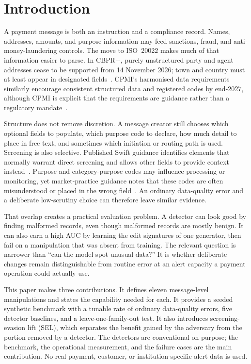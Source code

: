 \documentclass[conference]{IEEEtran}
\begin{document}
\section{Introduction}
A payment message is both an instruction and a compliance record. Names,
addresses, amounts, and purpose information may feed sanctions, fraud, and
anti-money-laundering controls. The move to ISO~20022 makes much of that
information easier to parse. In CBPR+, purely unstructured party and agent
addresses cease to be supported from 14 November 2026; town and country must
at least appear in designated fields~\cite{swift2026addr}. CPMI's harmonised
data requirements similarly encourage consistent structured data and
registered codes by end-2027, although CPMI is explicit that the requirements
are guidance rather than a regulatory mandate~\cite{cpmi2026}.

Structure does not remove discretion. A message creator still chooses which
optional fields to populate, which purpose code to declare, how much detail to
place in free text, and sometimes which initiation or routing path is used.
Screening is also selective. Published Swift guidance identifies elements that
normally warrant direct screening and allows other fields to provide context
instead~\cite{swiftgp2021}. Purpose and category-purpose codes may influence
processing or monitoring, yet market-practice guidance notes that these codes
are often misunderstood or placed in the wrong field~\cite{pmpg2024}. An
ordinary data-quality error and a deliberate low-scrutiny choice can therefore
leave similar evidence.

That overlap creates a practical evaluation problem. A detector can look good
by finding malformed records, even though malformed records are mostly benign.
It can also earn a high AUC by learning the edit signatures of one generator,
then fail on a manipulation that was absent from training. The relevant
question is narrower than ``can the model spot unusual data?'' It is whether
deliberate changes remain distinguishable from routine error at an alert
capacity a payment operation could actually use.

This paper makes three contributions. It defines eleven message-level
manipulations and states the capability needed for each. It provides a seeded
synthetic benchmark with a tunable rate of ordinary data-quality errors, five
detector baselines, and a leave-one-family-out test. It also introduces
screening-evasion lift (SEL), which separates the benefit gained by the
adversary from the portion removed by a detector. The detectors are
conventional on purpose; the benchmark, the operational measurement, and the
failure cases are the main contribution. No real payment, customer, or
institution-specific alert data is used.
\end{document}
